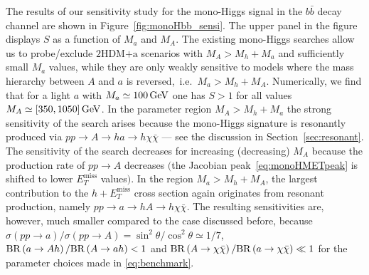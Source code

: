 \documentclass[a4paper, 11pt,notoc]{article}
\newcommand{\MET}{\ensuremath{E_T^\mathrm{miss}}\xspace}
\newcommand{\mA}{\ensuremath{M_{A}}\xspace}
\newcommand{\ma}{\ensuremath{M_{a}}\xspace}
\newcommand{\hdma}{\ensuremath{\textrm{2HDM+a}}\xspace}
\begin{document}
The results of our sensitivity study for the mono-Higgs signal in the $b \bar b$ decay channel are shown in Figure~\ref{fig:monoHbb_sensi}. The upper panel in the figure displays $S$  as a function of $\ma$ and $\mA$. %
The existing mono-Higgs searches allow us to probe/exclude \hdma scenarios with  $\mA > M_h + \ma$  and sufficiently small $\ma$ values, while they are only weakly  sensitive to models where the mass hierarchy between $A$ and $a$ is reversed,~i.e.~$\ma > M_h + \mA$. Numerically, we find that  for  a light $a$ with $\ma \simeq 100 \, {\rm GeV}$ one has $S > 1$ for all values $\mA \simeq [350, 1050] \, {\rm GeV}$. In the parameter region  $\mA > M_h + \ma$ the strong sensitivity of the search arises because the mono-Higgs signature is resonantly produced via $pp \to A \to ha \to h \chi \bar \chi$ --- see the discussion in Section~\ref{sec:resonant}. The sensitivity of the search decreases for increasing (decreasing) $M_A$ because the production rate of $pp \to A$  decreases $\big($the Jacobian peak~\eqref{eq:monoHMETpeak} is shifted to lower $\MET$ values$\big)$. In the region $\ma > M_h + \mA$, the largest contribution to the $h + \MET$ cross section again originates from resonant production, namely $pp \to a \to hA \to h \chi \bar \chi$.  The resulting sensitivities are, however, much smaller compared to the case discussed before, because  $\sigma \left (p p \to a \right )/\sigma \left (pp \to A \right ) = \sin^2 \theta/\cos^2 \theta \simeq 1/7$, ${\rm BR} \left ( a \to A h \right )/{\rm BR} \left (  A \to a h  \right ) < 1$ and ${\rm BR} \left ( A \to \chi \bar \chi \right )/{\rm BR} \left (  a \to \chi \bar \chi \right ) \ll~\!\!1$ for the parameter choices made in \eqref{eq:benchmark}. 
\end{document}

